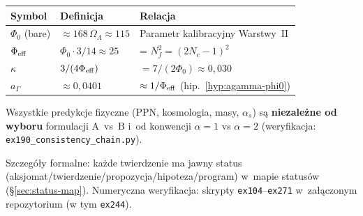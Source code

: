\begin{center}\small
\renewcommand{\arraystretch}{1.3}
\begin{tabular}{@{}lll@{}}
\toprule
\textbf{Symbol} & \textbf{Definicja} & \textbf{Relacja} \\
\midrule
$\Phi_0$ (bare) & $\approx 168\,\Omega_\Lambda \approx 115$ & Parametr kalibracyjny Warstwy~II \\
$\Phi_{\rm eff}$ & $\Phi_0 \cdot 3/14 \approx 25$ & = $N_f^2 = (2N_c - 1)^2$ \\
$\kappa$ & $3/(4\Phi_{\rm eff})$ & $= 7/(2\Phi_0) \approx 0{,}030$ \\
$a_\Gamma$ & $\approx 0{,}0401$ & $\approx 1/\Phi_{\rm eff}$ (hip.~\ref{hyp:agamma-phi0}) \\
\bottomrule
\end{tabular}
\end{center}

\noindent
Wszystkie predykcje fizyczne (PPN, kosmologia, masy, $\alpha_s$)
s\k{a} \textbf{niezale\.zne od wyboru} formulacji A~vs~B
i~od konwencji $\alpha = 1$ vs $\alpha = 2$
(weryfikacja: \texttt{ex190\_consistency\_chain.py}).

\bigskip\noindent
Szczeg\'o\l{}y formalne: ka\.zde twierdzenie ma jawny status
(aksjomat/twierdzenie/propozycja/hipoteza/program)
w~mapie status\'ow (\S\ref{sec:status-map}).
Numeryczna weryfikacja: skrypty \texttt{ex104}--\texttt{ex271}
w~za\l{}\k{a}czonym repozytorium (w tym \texttt{ex244}).

\newpage
